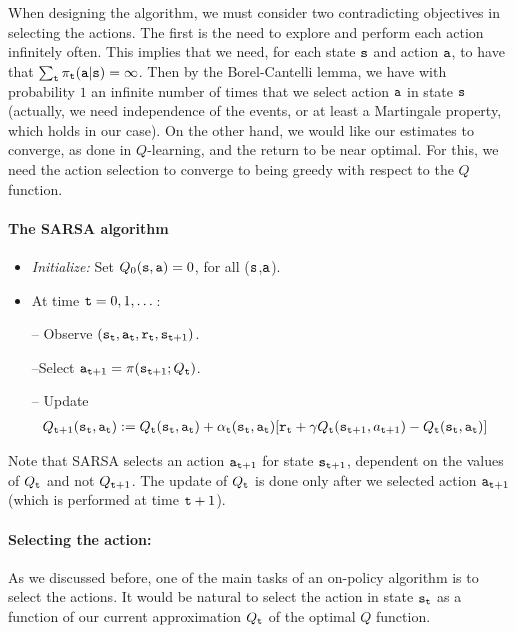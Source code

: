 When designing the algorithm, we must consider two contradicting objectives in selecting the actions. The first is the need to explore and perform each action infinitely often. This implies that we need, for each state ${\tt s}$ and action ${\tt a}$, to have that $\sum_{\tt t} \pi_{\tt t}({\tt a}|{\tt s})=\infty$. Then by the Borel-Cantelli lemma, we have with probability $1$ an infinite number of times that we select action ${\tt a}$ in state ${\tt s}$ (actually, we need independence of the events, or at least a Martingale property, which holds in our case). On the other hand, we would like our estimates to converge, as done in $Q$-learning, and the return  to be near optimal. For this, we need the action selection to converge to being greedy with respect to the $Q$ function.

\paragraph{The SARSA algorithm}

\begin{itemize}
\item {\em Initialize:} Set $ Q_0({\tt s},{\tt a})=0$, for all (${\tt s}$,${\tt a}$).

\item At time ${\tt t}=0,1,\dots$:

-- Observe
$({\tt s}_{\tt t},{\tt a}_{\tt t},{\tt r}_{\tt t},{\tt s}_{{\tt t}+1})$.

--Select ${\tt a}_{{\tt t}+1}=\pi({\tt s}_{{\tt t}+1};Q_{\tt t})$.

-- Update %
\begin{align*}
 Q_{{\tt t}+1}({\tt s}_{\tt t},{\tt a}_{\tt t}) & :=   Q_{\tt t} ({\tt s}_{\tt t},{\tt a}_{\tt t}) + \alpha_{\tt t}({\tt s}_{\tt t},{\tt a}_{\tt t})  [{\tt r}_{\tt t} +
\gamma  Q_{\tt t} ({\tt s}_{{\tt t}+1}, a_{{\tt t}+1}) -Q_{\tt t}
({\tt s}_{\tt t},{\tt a}_{\tt t})]
\end{align*}
\end{itemize}
Note that SARSA selects an action ${\tt a}_{{\tt t}+1}$ for state
${\tt s}_{{\tt t}+1}$, dependent on the values of $Q_{\tt t}$ and not
$Q_{{\tt t}+1}$. The update of $Q_{\tt t}$ is done only after we
selected action ${\tt a}_{{\tt t}+1}$ (which is performed at time
${\tt t}+1$).

\paragraph{Selecting the action:}
As we discussed before, one of the main tasks of an on-policy algorithm is to select the actions. 
It would be natural to select the action in state ${\tt s}_{\tt t}$ as a function of our current approximation $Q_{\tt t}$ of the optimal $Q$ function.

